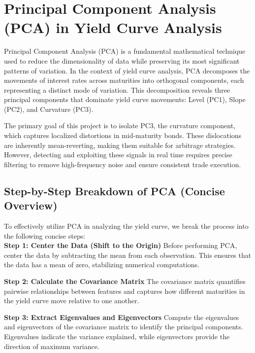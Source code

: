 \documentclass[12pt]{article}
\begin{document}
\vspace{3em}

\section{Principal Component Analysis (PCA) in Yield Curve Analysis}

Principal Component Analysis (PCA) is a fundamental mathematical technique used to reduce the dimensionality of data while preserving its most significant patterns of variation. In the context of yield curve analysis, PCA decomposes the movements of interest rates across maturities into orthogonal components, each representing a distinct mode of variation. This decomposition reveals three principal components that dominate yield curve movements: Level (PC1), Slope (PC2), and Curvature (PC3).

The primary goal of this project is to isolate PC3, the curvature component, which captures localized distortions in mid-maturity bonds. These dislocations are inherently mean-reverting, making them suitable for arbitrage strategies. However, detecting and exploiting these signals in real time requires precise filtering to remove high-frequency noise and ensure consistent trade execution.



\subsection{Step-by-Step Breakdown of PCA (Concise Overview)}

To effectively utilize PCA in analyzing the yield curve, we break the process into the following concise steps:\\

\textbf{Step 1: Center the Data (Shift to the Origin)}
Before performing PCA, center the data by subtracting the mean from each observation. This ensures that the data has a mean of zero, stabilizing numerical computations.

\textbf{Step 2: Calculate the Covariance Matrix}
The covariance matrix quantifies pairwise relationships between features and captures how different maturities in the yield curve move relative to one another.

\textbf{Step 3: Extract Eigenvalues and Eigenvectors}
Compute the eigenvalues and eigenvectors of the covariance matrix to identify the principal components. Eigenvalues indicate the variance explained, while eigenvectors provide the direction of maximum variance.
\end{document}
